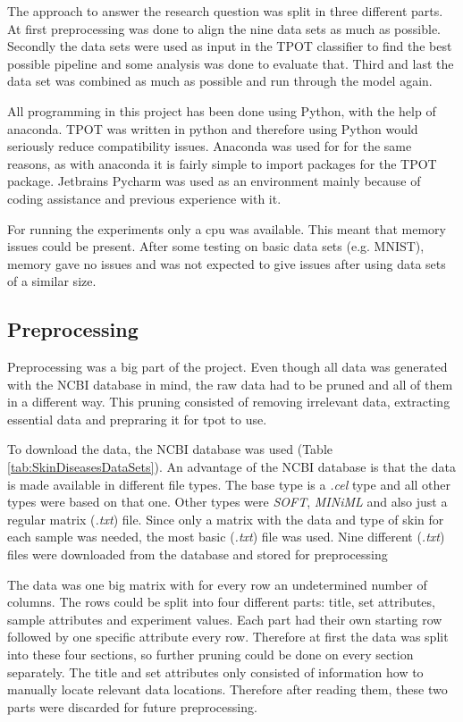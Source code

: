 \documentclass[10pt,a4paper]{article}
\begin{document}
	The approach to answer the research question was split in three different parts. At first preprocessing was done to align the nine data sets as much as possible. Secondly the data sets were used as input in the TPOT classifier to find the best possible pipeline and some analysis was done to evaluate that. Third and last the data set was combined as much as possible and run through the model again. 
	
	All programming in this project has been done using Python, with the help of anaconda. TPOT was written in python and therefore using Python would seriously reduce compatibility issues. Anaconda was used for for the same reasons, as with anaconda it is fairly simple to import packages for the TPOT package. Jetbrains Pycharm was used as an environment mainly because of coding assistance and previous experience with it.
	
	
	For running the experiments only a cpu was available. This meant that memory issues could be present. After some testing on basic data sets (e.g. MNIST), memory gave no issues and was not expected to give issues after using data sets of a similar size.
	
	\subsection{Preprocessing}
	\label{subsec:Preprocessing}
	
	Preprocessing was a big part of the project. Even though all data was generated with the NCBI database\cite{edgar2002gene} in mind, the raw data had to be pruned and all of them in a different way. This pruning consisted of removing irrelevant data, extracting essential data and prepraring it for tpot to use. 
	
	To download the data, the NCBI database was used (Table \ref{tab:SkinDiseasesDataSets}).  An advantage of the NCBI database is that the data is made available in different file types. The base type is a  \textit{.cel} type and all other types were based on that one. Other types were \textit{SOFT}, \textit{MINiML} and also just a regular matrix (\textit{.txt}) file. Since only a matrix with the data and type of skin for each sample was needed, the most basic (\textit{.txt}) file was used. Nine different (\textit{.txt}) files were downloaded from the database and stored for preprocessing
	
	The data was one big matrix with for every row an undetermined number of columns. The rows could be split into four different parts: title, set attributes, sample attributes and experiment values. Each part had their own starting row followed by one specific attribute every row. Therefore at first the data was split into these four sections, so further pruning could be done on every section separately. The title and set attributes only consisted of information how to manually locate relevant data locations. Therefore after reading them, these two parts were discarded for future preprocessing.
	
\end{document}

